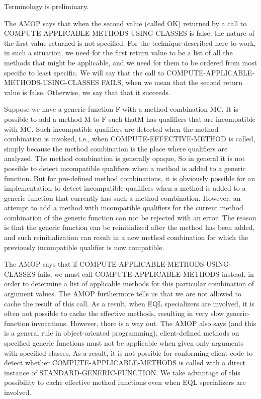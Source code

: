 Terminology is preliminary.

The AMOP says that when the second value (called OK) returned by a
call to COMPUTE-APPLICABLE-METHODS-USING-CLASSES is false, the nature
of the first value returned is not specified.  For the technique
described here to work, in such a situation, we need for the first
return value to be a list of all the methods that might be applicable,
and we need for them to be ordered from most specific to least
specific.  We will say that the call to
COMPUTE-APPLICABLE-METHODS-USING-CLASSES FAILS, when we mean that the
second return value is false.  Otherwise, we say that that it
succeeds.

Suppose we have a generic function F with a method combination MC.  It
is possible to add a method M to F such thatM has qualifiers that are
incompatible with MC.  Such incompatible qualifiers are detected when
the method combination is invoked, i.e., when COMPUTE-EFFECTIVE-METHOD
is called, simply because the method combination is the place where
qualifiers are analyzed.  The method combination is generally opaque,
So in general it is not possible to detect incompatible qualifiers
when a method is added to a generic function.  But for pre-defined
method combinations, it is obviously possible for an implementation to
detect incompatible qualifiers when a method is added to a generic
function that currently has such a method combination.  However, an
attempt to add a method with incompatible qualifiers for the current
method combination of the generic function can not be rejected with an
error.  The reason is that the generic function can be reinitialized
after the method has been added, and such reinitialization can result
in a new method combination for which the previously incompatible
qualifier is now compatible.

The AMOP says that if COMPUTE-APPLICABLE-METHODS-USING-CLASSES fails,
we must call COMPUTE-APPLICABLE-METHODS instead, in order to determine
a list of applicable methods for this particular combination of
argument values.  The AMOP furthermore tells us that we are not
allowed to cache the result of this call.  As a result, when EQL
specializers are involved, it is often not possible to cache the
effective methods, resulting in very slow generic-function
invocations.  However, there is a way out.  The AMOP also says (and
this is a general rule in object-oriented programming), client-defined
methods on specified generic functions must not be applicable when
given only arguments with specified classes.  As a result, it is not
possible for conforming client code to detect whether
COMPUTE-APPLICABLE-METHODS is called with a direct instance of
STANDARD-GENERIC-FUNCTION.  We take advantage of this possibility to
cache effective method functions even when EQL specializers are
involved.

